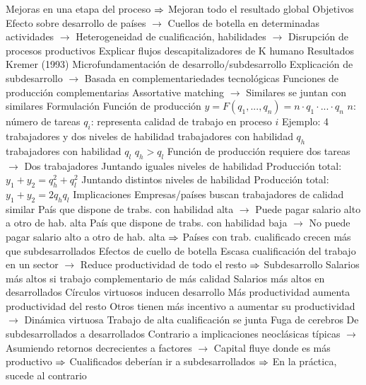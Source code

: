 \documentclass{nuevotema}
\begin{document}
\begin{esquemal}
				\4[] Mejoras en una etapa del proceso
				\4[] $\Rightarrow$ Mejoran todo el resultado global
				\4 Objetivos
				\4[] Efecto sobre desarrollo de países
				\4[] $\to$ Cuellos de botella en determinadas actividades
				\4[] $\to$ Heterogeneidad de cualificación, habilidades
				\4[] $\to$ Disrupción de procesos productivos
				\4[] Explicar flujos descapitalizadores de K humano
				\4 Resultados
				\4[] Kremer (1993)
				\4[] Microfundamentación de desarrollo/subdesarrollo
				\4[] Explicación de subdesarrollo
				\4[] $\to$ Basada en complementariedades tecnológicas
				\4[] Funciones de producción complementarias
				\4[] Assortative matching
				\4[] $\to$ Similares se juntan con similares
			\3 Formulación
				\4 Función de producción
				\4[] $y=F(q_1, ..., q_n) = n \cdot q_1 \cdot ... \cdot q_n$
				\4[] $n$: número de tareas
				\4[] $q_i$: representa calidad de trabajo en proceso $i$
				\4 Ejemplo: 4 trabajadores y dos niveles de habilidad
				 trabajadores con habilidad $q_h$
				 trabajadores con habilidad $q_l$
				\4[] $q_h > q_l$
				\4[] Función de producción requiere dos tareas
				\4[] $\to$ Dos trabajadores
				\4 Juntando iguales niveles de habilidad
				\4[] Producción total: $y_1 + y_2 = q_h^2 + q_l^2$
				\4 Juntando distintos niveles de habilidad
				\4[] Producción total: $y_1 + y_2 = 2q_h q_l$
			\3 Implicaciones
				\4 Empresas/países buscan trabajadores de calidad similar
				\4[] País que dispone de trabs. con habilidad alta
				\4[] $\to$ Puede pagar salario alto a otro de hab. alta
				\4[] País que dispone de trabs. con habilidad baja
				\4[] $\to$ No puede pagar salario alto a otro de hab. alta
				\4[] $\Rightarrow$ Países con trab. cualificado crecen más que subdesarrollados
				\4 Efectos de cuello de botella
				\4[] Escasa cualificación del trabajo en un sector
				\4[] $\to$ Reduce productividad de todo el resto
				\4[] $\Rightarrow$ Subdesarrollo
				\4 Salarios más altos si trabajo complementario de más calidad
				\4[] Salarios más altos en desarrollados
				\4 Círculos virtuosos inducen desarrollo
				\4[] Más productividad aumenta productividad del resto
				\4[] Otros tienen más incentivo a aumentar su productividad
				\4[] $\to$ Dinámica virtuosa
				\4 Trabajo de alta cualificación se junta
				\4 Fuga de cerebros
				\4[] De subdesarrollados a desarrollados
				\4[] Contrario a implicaciones neoclásicas típicas
				\4[] $\to$ Asumiendo retornos decrecientes a factores
				\4[] $\to$ Capital fluye donde es más productivo
				\4[] $\Rightarrow$ Cualificados deberían ir a subdesarrollados
				\4[] $\Rightarrow$ En la práctica, sucede al contrario

\end{esquemal}
\end{document}

